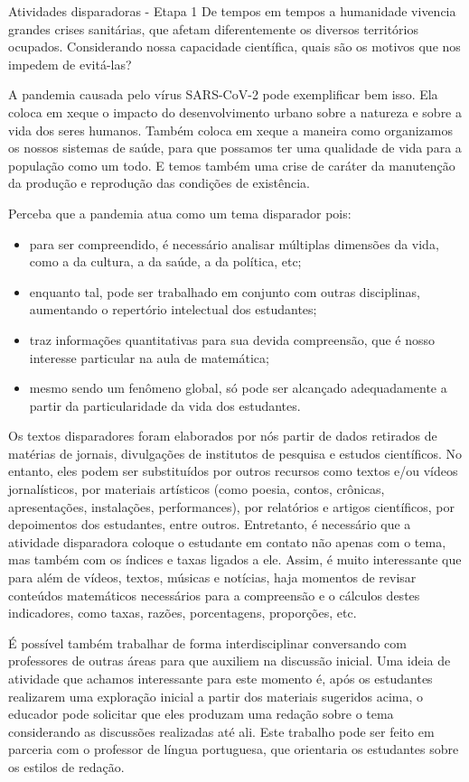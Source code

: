 \begin{paginatexto}{Atividades disparadoras - Etapa 1}
De tempos em tempos a humanidade vivencia grandes crises sanitárias, que afetam diferentemente os diversos territórios ocupados. Considerando nossa capacidade científica, quais são os motivos que nos impedem de evitá-las?

A pandemia causada pelo vírus SARS-CoV-2 pode exemplificar bem isso. Ela coloca em xeque o impacto do desenvolvimento urbano sobre a natureza e sobre a vida dos seres humanos. Também coloca em xeque a maneira como organizamos os nossos sistemas de saúde, para que possamos ter uma qualidade de vida para a população como um todo. E temos também uma crise de caráter da manutenção da produção e reprodução das condições de existência.

Perceba que a pandemia atua como um tema disparador pois:

\begin{itemize}
\item para ser compreendido, é necessário analisar múltiplas dimensões da vida, como a da cultura, a da saúde, a da política, etc;
\item enquanto tal, pode ser trabalhado em conjunto com outras disciplinas, aumentando o repertório intelectual dos estudantes;
\item traz informações quantitativas para sua devida compreensão, que é nosso interesse particular na aula de matemática;
\item mesmo sendo um fenômeno global, só pode ser alcançado adequadamente a partir da particularidade da vida dos estudantes.
\end{itemize}

Os textos disparadores foram elaborados por nós partir de dados retirados de matérias de jornais, divulgações de institutos de pesquisa e estudos científicos. No entanto, eles podem ser substituídos por outros recursos como textos e/ou vídeos jornalísticos, por materiais artísticos (como poesia, contos, crônicas, apresentações, instalações, performances), por relatórios e artigos científicos, por depoimentos dos estudantes, entre outros. Entretanto, é necessário que a atividade disparadora coloque o estudante em contato não apenas com o tema, mas também com os índices e taxas ligados a ele. Assim, é muito interessante que para além de vídeos, textos, músicas e notícias, haja momentos de revisar conteúdos matemáticos necessários para a compreensão e o cálculos destes indicadores, como taxas, razões, porcentagens, proporções, etc. 

É possível também trabalhar de forma interdisciplinar conversando com professores de outras áreas para que auxiliem na discussão inicial. Uma ideia de atividade que achamos interessante para este momento é, após os estudantes realizarem uma exploração inicial a partir dos materiais sugeridos acima, o educador pode solicitar que eles produzam uma redação sobre o tema considerando as discussões realizadas até ali. Este trabalho pode ser feito em parceria com o professor de língua portuguesa, que orientaria os estudantes sobre os estilos de redação.


\end{paginatexto}
